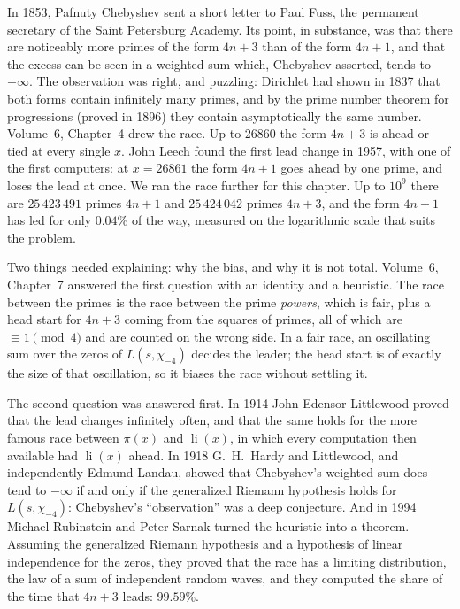 In 1853, Pafnuty Chebyshev sent a short letter to Paul Fuss, the permanent secretary of the Saint Petersburg Academy. Its point, in substance, was that there are noticeably more primes of the form $4n+3$ than of the form $4n+1$, and that the excess can be seen in a weighted sum which, Chebyshev asserted, tends to $-\infty$. The observation was right, and puzzling: Dirichlet had shown in 1837 that both forms contain infinitely many primes, and by the prime number theorem for progressions (proved in 1896) they contain asymptotically the same number. Volume~6, Chapter~4 drew the race. Up to $26860$ the form $4n+3$ is ahead or tied at every single $x$. John Leech found the first lead change in 1957, with one of the first computers: at $x=26861$ the form $4n+1$ goes ahead by one prime, and loses the lead at once. We ran the race further for this chapter. Up to $10^9$ there are $25\,423\,491$ primes $4n+1$ and $25\,424\,042$ primes $4n+3$, and the form $4n+1$ has led for only $0.04\%$ of the way, measured on the logarithmic scale that suits the problem.

Two things needed explaining: why the bias, and why it is not total. Volume~6, Chapter~7 answered the first question with an identity and a heuristic. The race between the primes is the race between the prime \emph{powers}, which is fair, plus a head start for $4n+3$ coming from the squares of primes, all of which are $\equiv1\pmod4$ and are counted on the wrong side. In a fair race, an oscillating sum over the zeros of $L(s,\chi_{-4})$ decides the leader; the head start is of exactly the size of that oscillation, so it biases the race without settling it.

The second question was answered first. In 1914 John Edensor Littlewood proved that the lead changes infinitely often, and that the same holds for the more famous race between $\pi(x)$ and $\operatorname{li}(x)$, in which every computation then available had $\operatorname{li}(x)$ ahead. In 1918 G.~H.~Hardy and Littlewood, and independently Edmund Landau, showed that Chebyshev's weighted sum does tend to $-\infty$ if and only if the generalized Riemann hypothesis holds for $L(s,\chi_{-4})$: Chebyshev's ``observation'' was a deep conjecture. And in 1994 Michael Rubinstein and Peter Sarnak turned the heuristic into a theorem. Assuming the generalized Riemann hypothesis and a hypothesis of linear independence for the zeros, they proved that the race has a limiting distribution, the law of a sum of independent random waves, and they computed the share of the time that $4n+3$ leads: $99.59\%$.

